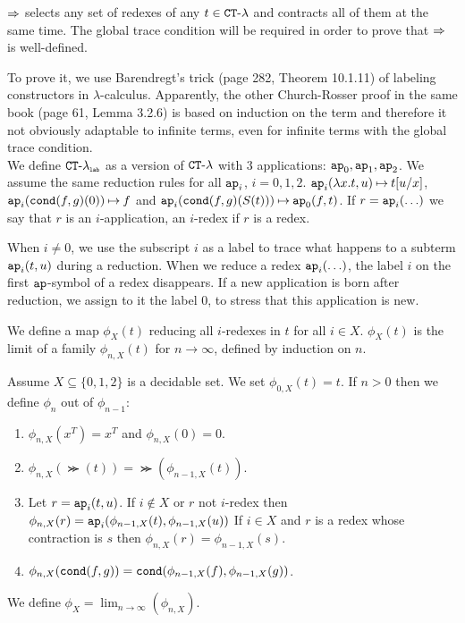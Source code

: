 ${\Rightarrow}$ selects any set of redexes of any $t \in { {\tt CT} \mbox{-} \lambda}$ 
and contracts all of them at the same time. 
The global trace condition will be required in order to prove that ${\Rightarrow}$ is well-defined.


To prove it, we use Barendregt's trick 
(page 282, Theorem 10.1.11) 
of labeling constructors in $\lambda$-calculus.
Apparently, the other Church-Rosser proof in the same book (page 61, Lemma 3.2.6)
is based on induction on the term and therefore it not obviously adaptable to infinite terms,
even for infinite terms with the global trace condition.
\\

We define ${{ {\tt CT} \mbox{-} \lambda}_{\mbox{\tiny \tt lab}}}$ as a version of ${ {\tt CT} \mbox{-} \lambda}$ with $3$ applications: 
${\tt ap}_0, {\tt ap}_1, {\tt ap}_2$. We assume the same reduction rules for all ${\tt ap}_i$, $i =0,1,2$.
${\tt ap}_i(\lambda x.t,u) \mathbin{\mapsto} t[u/x]$, ${\tt ap}_i({\tt cond}(f,g)(0)) \mathbin{\mapsto} f$ and
${\tt ap}_i({\tt cond}(f,g)(S(t))) \mathbin{\mapsto} {\tt ap}_0(f,t)$. 
If $r = {\tt ap}_i(\ldots)$ we say that $r$ is an $i$-application, an $i$-redex if $r$ is a redex.

When $i \not = 0$, we use the subscript $i$ as a label to trace what
happens to a subterm ${\tt ap}_i(t,u)$ during a reduction. When we reduce a redex ${\tt ap}_i(\ldots)$,
the label $i$ on the first ${\tt ap}$-symbol of a redex disappears. If a new application is born after
reduction,
we assign to it the label $0$, to stress that this application is new. 

We define a map  $\phi_X(t)$ reducing all $i$-redexes in $t$ for all $i \in X$. 
$\phi_X(t)$ is the limit of a family $\phi_{n,X}(t)$ for $n \rightarrow \infty$, defined by induction on $n$.


\begin{definition}
Assume $X \subseteq \{0,1,2\}$ is a decidable set. 
We set $\phi_{0,X}(t)=t$. If $n >0$ then we define $\phi_n$ out of $\phi_{n-1}$:
\begin{enumerate} 

\item
$\phi_{n,X}(x^T)=x^T$ and $\phi_{n,X}(0)=0$.

\item
$\phi_{n,X}(\Succ(t)) = \Succ(\phi_{n-1,X}(t))$. 

\item
Let $r = {\tt ap}_i(t,u)$. If  $i \not \in X$ or $r$ not $i$-redex then 
$\phi_{n,X}(r) = {\tt ap}_i(\phi_{n-1,X}(t),\phi_{n-1,X}(u))$
If $i \in X$ and $r$ is a redex whose contraction is $s$ then $\phi_{n,X}(r) = \phi_{n-1,X}(s)$.

\item
$\phi_{n,X}({\tt cond}(f,g)) = {\tt cond}(\phi_{n-1,X}(f), \phi_{n-1,X}(g))$.

\end{enumerate}

We define $\phi_X = \lim_{n \rightarrow \infty}(\phi_{n,X})$.
\end{definition}

